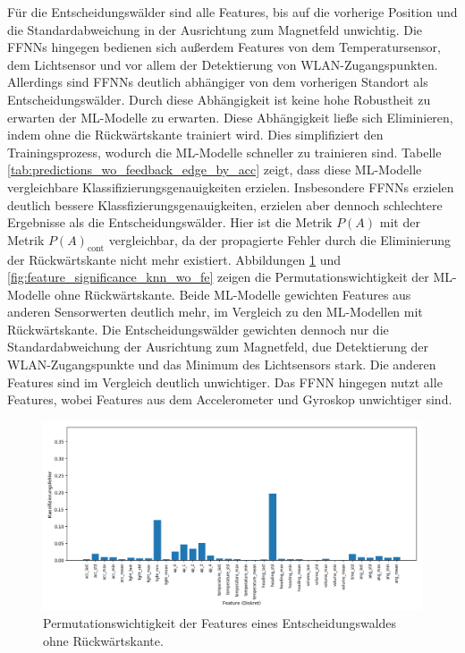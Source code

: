 \newline
\newline
Für die Entscheidungswälder sind alle Features, bis auf die vorherige Position und die Standardabweichung in der Ausrichtung zum Magnetfeld unwichtig.
Die FFNNs hingegen bedienen sich außerdem Features von dem Temperatursensor, dem Lichtsensor und vor allem der Detektierung von WLAN-Zugangspunkten.
Allerdings sind FFNNs deutlich abhängiger von dem vorherigen Standort als Entscheidungswälder.
\newline
\newline
Durch diese Abhängigkeit ist keine hohe Robustheit zu erwarten der ML-Modelle zu erwarten.
Diese Abhängigkeit ließe sich Eliminieren, indem ohne die Rückwärtskante trainiert wird.
Dies simplifiziert den Trainingsprozess, wodurch die ML-Modelle schneller zu trainieren sind.
Tabelle \ref{tab:predictions_wo_feedback_edge_by_acc} zeigt, dass diese ML-Modelle vergleichbare Klassifizierungsgenauigkeiten erzielen.
Insbesondere FFNNs erzielen deutlich bessere Klassfizierungsgenauigkeiten, erzielen aber dennoch schlechtere Ergebnisse als die Entscheidungswälder.
Hier ist die Metrik $P(A)$ mit der Metrik $P(A)_{\text{cont}}$ vergleichbar, da der propagierte Fehler durch die Eliminierung der Rückwärtskante nicht mehr existiert.
\newline
\newline
Abbildungen \ref{fig:feature_significance_dt_wo_fe} und \ref{fig:feature_significance_knn_wo_fe} zeigen die Permutationswichtigkeit der ML-Modelle ohne Rückwärtskante.
Beide ML-Modelle gewichten Features aus anderen Sensorwerten deutlich mehr, im Vergleich zu den ML-Modellen mit Rückwärtskante.
Die Entscheidungswälder gewichten dennoch nur die Standardabweichung der Ausrichtung zum Magnetfeld, due Detektierung der WLAN-Zugangspunkte und das Minimum des Lichtsensors stark.
Die anderen Features sind im Vergleich deutlich unwichtiger.
Das FFNN hingegen nutzt alle Features, wobei Features aus dem Accelerometer und Gyroskop unwichtiger sind.
\begin{figure}[h!]
    \centering
    \includegraphics[width=\linewidth]{images/fi_wo_fe_dt.png}
    \caption{Permutationswichtigkeit der Features eines Entscheidungswaldes ohne Rückwärtskante.}
    \label{fig:feature_significance_dt_wo_fe}
\end{figure}
